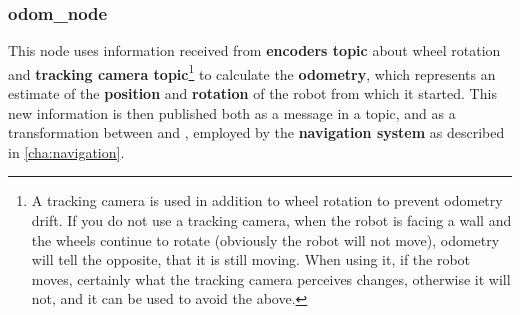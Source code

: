 \subsubsection{odom\_node}

This node uses information received from \textbf{encoders topic} about wheel rotation and \textbf{tracking camera topic}\footnote{A tracking camera is used in addition to wheel rotation to prevent odometry drift. If you do not use a tracking camera, when the robot is facing a wall and the wheels continue to rotate (obviously the robot will not move), odometry will tell the opposite, that it is still moving. When using it, if the robot moves, certainly what the tracking camera perceives changes, otherwise it will not, and it can be used to avoid the above.} to calculate the \textbf{odometry}, which represents an estimate of the \textbf{position} and \textbf{rotation} of the robot from which it started. This new information is then published both as a message in a topic, and as a transformation between  and , employed by the \textbf{navigation system} as described in \autoref{cha:navigation}.